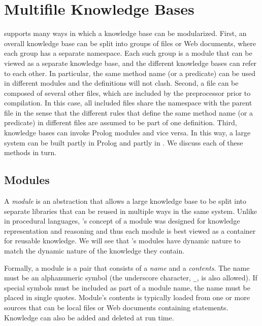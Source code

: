 \documentclass[11pt]{article}
\newcommand{\ERGO}{\mbox{\smaller{\ensuremath{\cal{E}}\smaller{{\sc{RGO}}}}}\xspace}
\newcommand{\FLSYSTEM}{\ERGO}
\begin{document}
\section{Multifile Knowledge Bases}

\FLSYSTEM supports many ways in which a knowledge base can be modularized.
First, an overall knowledge base
can be split into groups of files or Web documents, where each
group has a separate namespace. Each
such group is a module that
can be viewed as a separate knowledge base, and the different
knowledge bases can refer to
each other. In particular, the same method name (or a
predicate) can be used in different modules and the definitions will not
clash.  Second, a file can be composed of several other files, which
are included by the preprocessor prior to compilation. In this
case, all included files share the namespace with the parent file
in the sense that the different
rules that define the same method name (or a predicate) in different files
are assumed to be part of one definition. Third, \FLSYSTEM knowledge bases
can invoke
Prolog modules and vice versa. In this way, a large system can be built partly
in Prolog and partly in \FLSYSTEM.
We discuss each of these methods in turn.


\subsection{\FLSYSTEM Modules} \label{sec:flora-modules}

A \emph{\FLSYSTEM module} is an abstraction that allows a large knowledge
base to be split into separate libraries that can be reused in multiple
ways in the same system.  Unlike in procedural languages, \FLSYSTEM's
concept of a module was designed for knowledge representation and reasoning
and thus each module is best viewed as a container for reusable knowledge.
We will see that \FLSYSTEM's modules have dynamic nature to match the
dynamic nature of the knowledge they contain.

Formally, a module is a pair that consists of a
\emph{name} and a \emph{contents}. The name must be an alphanumeric symbol
(the underscore character, {\tt \_}, is also allowed). If special symbols
must be included as part of a module name, the name must be placed in single
quotes.
Module's contents
is typically loaded from one or more sources that
can be local files or Web documents containing \FLSYSTEM statements. Knowledge can also be added and
deleted at run time.
\end{document}
